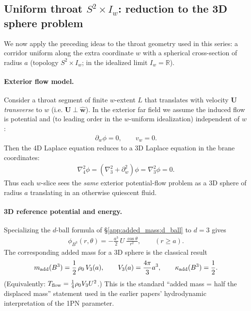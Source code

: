 \documentclass[11pt]{article}
\begin{document}
\subsection{Uniform throat \texorpdfstring{$S^2\times I_w$}{S\string^2 x I\_w}: reduction to the 3D sphere problem}
\label{app:added_mass:throat}
We now apply the preceding ideas to the throat geometry used in this series:
a corridor uniform along the extra coordinate $w$ with a spherical cross-section
of radius $a$ (topology $S^2\times I_w$; in the idealized limit $I_w=\mathbb R$).

\paragraph{Exterior flow model.}
Consider a throat segment of finite $w$-extent $L$ that translates with velocity
$\mathbf U$ \emph{transverse} to $w$ (i.e. $\mathbf U\perp \hat{\mathbf w}$).
In the exterior far field we assume the induced flow is potential and (to leading
order in the $w$-uniform idealization) independent of $w$:
\begin{align}
\partial_w \phi = 0,
\qquad
v_w=0.
\end{align}
Then the 4D Laplace equation reduces to a 3D Laplace equation in the brane
coordinates:
\begin{align}
\nabla_4^2 \phi
=
(\nabla_3^2 + \partial_w^2)\phi
=
\nabla_3^2 \phi
=
0.
\end{align}
Thus each $w$-slice sees the \emph{same} exterior potential-flow problem as a
3D sphere of radius $a$ translating in an otherwise quiescent fluid.

\paragraph{3D reference potential and energy.}
Specializing the $d$-ball formula of \S\ref{app:added_mass:d_ball} to $d=3$ gives
\begin{align}
\phi_{B^3}(r,\theta)
=
-\frac{a^{3}}{2}\,U\,\frac{\cos\theta}{r^{2}},
\qquad
(r\ge a).
\end{align}
The corresponding added mass for a 3D sphere is the classical result
\begin{align}
m_{\rm add}(B^3)
=
\frac{1}{2}\,\rho_0\,V_3(a),
\qquad
V_3(a)=\frac{4\pi}{3}a^3,
\qquad
\kappa_{\rm add}(B^3)=\frac{1}{2}.
\end{align}
(Equivalently: $T_{\rm flow}=\tfrac{1}{4}\rho_0 V_3 U^2$.)  This is the standard
``added mass = half the displaced mass'' statement used in the earlier papers’
hydrodynamic interpretation of the 1PN parameter.
\end{document}
